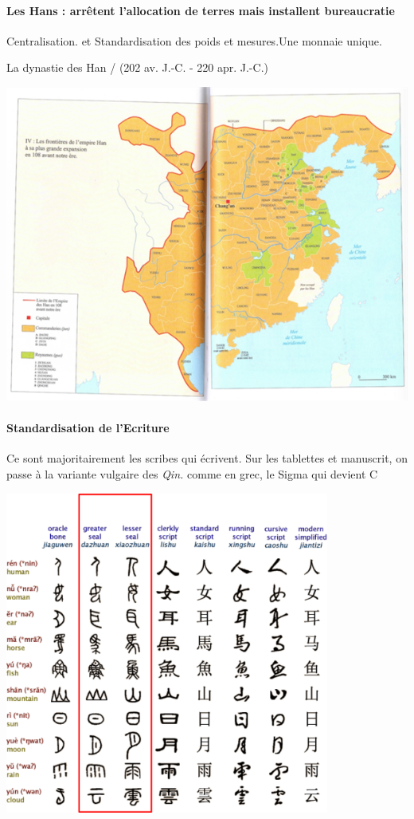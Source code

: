 \paragraph{Les Hans : arrêtent l'allocation de terres mais installent bureaucratie} Centralisation. et Standardisation des poids et mesures.Une monnaie unique. 
\begin{marginfigure} 
    \centering
        \caption{La dynastie des Han  /  (202 av. J.-C. - 220 apr. J.-C.)}
\includegraphics[width=\textwidth]{ConfucianismeTaoismeBouddhismeChinois/Images/CarteHan.png}

    \label{fig:enter-label}
\end{marginfigure}
\paragraph{Standardisation de l'Ecriture} Ce sont majoritairement les scribes qui écrivent. Sur les tablettes et manuscrit, on passe à la variante vulgaire des \textit{Qin. } {comme en grec, le Sigma qui devient C}


\includegraphics[width=0.8\textwidth]{ConfucianismeTaoismeBouddhismeChinois/Images/StandardisationEcritureQin.png}


